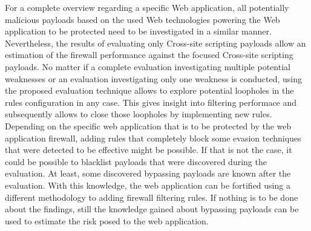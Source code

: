 For a complete overview regarding a specific Web application, all potentially malicious payloads based on the used Web technologies powering the Web application to be protected need to be investigated in a similar manner. Nevertheless, the results of evaluating only Cross-site scripting payloads allow an estimation of the firewall performance against the focused Cross-site scripting payloads. No matter if a complete evaluation investigating multiple potential weaknesses or an evaluation investigating only one weakness is conducted, using the proposed evaluation technique allows to explore potential loopholes in the rules configuration in any case. This gives insight into filtering performace and subsequently allows to close those loopholes by implementing new rules.
Depending on the specific web application that is to be protected by the web application firewall, adding rules that completely block some evasion techniques that were detected to be effective might be possible. If that is not the case, it could be possible to blacklist payloads that were discovered during the evaluation. At least, some discovered bypassing payloads are known after the evaluation. With this knowledge, the web application can be fortified using a different methodology to adding firewall filtering rules. If nothing is to be done about the findings, still the knowledge gained about bypassing payloads can be used to estimate the risk posed to the web application.

